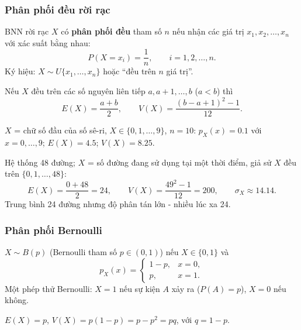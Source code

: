 \documentclass[12pt,a4paper]{article}
\begin{document}
\subsubsection{Phân phối đều rời rạc}

\begin{dinhnghia}
  BNN rời rạc $X$ có \textbf{phân phối đều} tham số $n$ nếu nhận các giá trị $x_1, x_2, \ldots, x_n$ với xác suất bằng nhau:
  \[
    P(X = x_i) = \dfrac{1}{n}, \qquad i = 1, 2, \ldots, n.
  \]
  Ký hiệu: $X \sim U\{x_1, \ldots, x_n\}$ hoặc ``đều trên $n$ giá trị''.
\end{dinhnghia}

\begin{dinhly}
  Nếu $X$ đều trên các số nguyên liên tiếp $a, a+1, \ldots, b$ ($a < b$) thì
  \[
    E(X) = \dfrac{a+b}{2}, \qquad V(X) = \dfrac{(b-a+1)^2 - 1}{12}.
  \]
\end{dinhly}

\begin{vidu}[title={Chữ số đầu số sê-ri}]
$X$ = chữ số đầu của số sê-ri, $X \in \{0,1,\ldots,9\}$, $n = 10$:
$p_X(x) = 0.1$ với $x = 0,\ldots,9$; $E(X) = 4.5$; $V(X) = 8.25$.
\end{vidu}

\begin{vidu}[title={Số đường truyền đang dùng}]
Hệ thống 48 đường; $X$ = số đường đang sử dụng tại một thời điểm, giả sử $X$ đều trên $\{0,1,\ldots,48\}$:
\[
  E(X) = \dfrac{0+48}{2} = 24, \qquad V(X) = \dfrac{49^2 - 1}{12} = 200, \qquad \sigma_X \approx 14.14.
\]
Trung bình 24 đường nhưng độ phân tán lớn - nhiều lúc xa 24.
\end{vidu}

\subsubsection{Phân phối Bernoulli}

\begin{dinhnghia}
  $X \sim B(p)$ (Bernoulli tham số $p \in (0,1)$) nếu $X \in \{0, 1\}$ và
  \[
    p_X(x) = \begin{cases}
      1-p, & x = 0, \\
      p,   & x = 1.
    \end{cases}
  \]
  Một phép thử Bernoulli: $X = 1$ nếu sự kiện $A$ xảy ra ($P(A) = p$), $X = 0$ nếu không.
\end{dinhnghia}

\begin{dinhly}
  $E(X) = p$, \quad $V(X) = p(1-p) = p - p^2 = pq$, với $q = 1-p$.
\end{dinhly}
\end{document}
